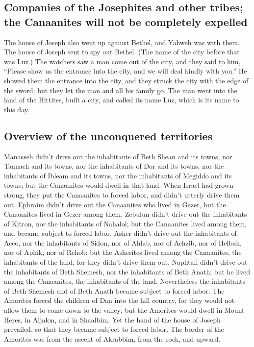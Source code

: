 \hypertarget{companies-of-the-josephites-and-other-tribes-the-canaanites-will-not-be-completely-expelled}{%
\subsection{Companies of the Josephites and other tribes; the Canaanites
will not be completely
expelled}\label{companies-of-the-josephites-and-other-tribes-the-canaanites-will-not-be-completely-expelled}}

 The house of Joseph also went up against Bethel, and
Yahweh was with them.  The house of Joseph sent to spy
out Bethel. (The name of the city before that was Luz.) 
The watchers saw a man come out of the city, and they said to him,
``Please show us the entrance into the city, and we will deal kindly
with you.''  He showed them the entrance into the city,
and they struck the city with the edge of the sword; but they let the
man and all his family go.  The man went into the land of
the Hittites, built a city, and called its name Luz, which is its name
to this day.

\hypertarget{overview-of-the-unconquered-territories}{%
\subsection{Overview of the unconquered
territories}\label{overview-of-the-unconquered-territories}}

 Manasseh didn't drive out the inhabitants of Beth Shean
and its towns, nor Taanach and its towns, nor the inhabitants of Dor and
its towns, nor the inhabitants of Ibleam and its towns, nor the
inhabitants of Megiddo and its towns; but the Canaanites would dwell in
that land.  When Israel had grown strong, they put the
Canaanites to forced labor, and didn't utterly drive them out.
 Ephraim didn't drive out the Canaanites who lived in
Gezer, but the Canaanites lived in Gezer among them. 
Zebulun didn't drive out the inhabitants of Kitron, nor the inhabitants
of Nahalol; but the Canaanites lived among them, and became subject to
forced labor.  Asher didn't drive out the inhabitants of
Acco, nor the inhabitants of Sidon, nor of Ahlab, nor of Achzib, nor of
Helbah, nor of Aphik, nor of Rehob;  but the Asherites
lived among the Canaanites, the inhabitants of the land, for they didn't
drive them out.  Naphtali didn't drive out the
inhabitants of Beth Shemesh, nor the inhabitants of Beth Anath; but he
lived among the Canaanites, the inhabitants of the land. Nevertheless
the inhabitants of Beth Shemesh and of Beth Anath became subject to
forced labor.  The Amorites forced the children of Dan
into the hill country, for they would not allow them to come down to the
valley;  but the Amorites would dwell in Mount Heres, in
Aijalon, and in Shaalbim. Yet the hand of the house of Joseph prevailed,
so that they became subject to forced labor.  The border
of the Amorites was from the ascent of Akrabbim, from the rock, and
upward.

